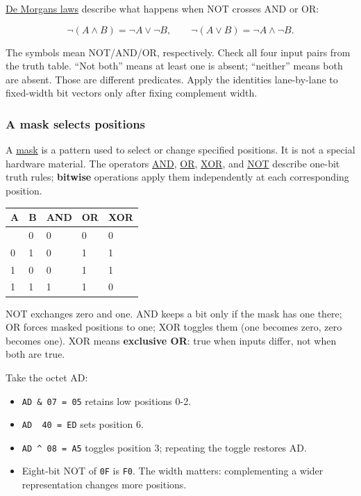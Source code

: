 \hyperref[appendix-9079d3659da4]{De Morgan\textquotesingle s laws} describe what happens when NOT crosses AND or OR:

\[
\neg(A\land B)=\neg A\lor\neg B,\qquad
\neg(A\lor B)=\neg A\land\neg B.
\]

The symbols mean NOT/AND/OR, respectively. Check all four input pairs from the truth table. ``Not both'' means at least one is absent; ``neither'' means both are absent. Those are different predicates. Apply the identities lane-by-lane to fixed-width bit vectors only after fixing complement width.

\subsubsection{A mask selects positions}\label{01-foundations-i-ch001-a-mask-selects-positions}

\hypertarget{01-foundations-i-ch001-a-mask-selects-positions}{}

A \hyperref[appendix-dbe5905163c2]{mask} is a pattern used to select or change specified positions. It is not a special hardware material. The operators \hyperref[appendix-68b52453737c]{AND}, \hyperref[appendix-a427ce8ce8a6]{OR}, \hyperref[appendix-d49161831368]{XOR}, and \hyperref[appendix-8f38927cfc54]{NOT} describe one-bit truth rules; \textbf{bitwise} operations apply them independently at each corresponding position.

{\def\LTcaptype{none} %
\begin{longtable}[]{@{}lllll@{}}
\toprule\noalign{}
A & B & AND & OR & XOR \\
\midrule\noalign{}
\endhead
\bottomrule\noalign{}
\endlastfoot
0 & 0 & 0 & 0 & 0 \\
0 & 1 & 0 & 1 & 1 \\
1 & 0 & 0 & 1 & 1 \\
1 & 1 & 1 & 1 & 0 \\
\end{longtable}
}

NOT exchanges zero and one. AND keeps a bit only if the mask has one there; OR forces masked positions to one; XOR toggles them (one becomes zero, zero becomes one). XOR means \textbf{exclusive OR}: true when inputs differ, not when both are true.

Take the octet AD:

\begin{itemize}
\tightlist
\item
  \texttt{AD\ \&\ 07\ =\ 05} retains low positions 0-2.
\item
  \texttt{AD\ \textbar{}\ 40\ =\ ED} sets position 6.
\item
  \texttt{AD\ \^{}\ 08\ =\ A5} toggles position 3; repeating the toggle restores AD.
\item
  Eight-bit NOT of \texttt{0F} is \texttt{F0}. The width matters: complementing a wider representation changes more positions.
\end{itemize}

